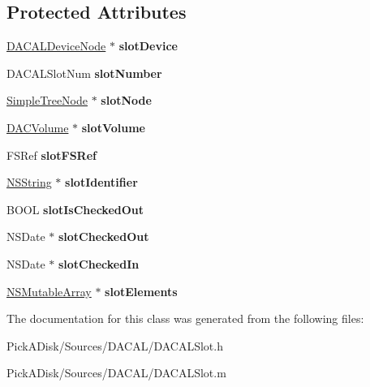 \subsection*{Protected Attributes}
\begin{DoxyCompactItemize}
\item 
\hypertarget{interface_d_a_c_a_l_slot_ad21e445e7323248f836d2ff47f73a28c}{
\hyperlink{interface_d_a_c_a_l_device_node}{DACALDeviceNode} $\ast$ {\bfseries slotDevice}}
\label{interface_d_a_c_a_l_slot_ad21e445e7323248f836d2ff47f73a28c}

\item 
\hypertarget{interface_d_a_c_a_l_slot_aff0ad5f88d1f523b314b6e92fcd860c1}{
DACALSlotNum {\bfseries slotNumber}}
\label{interface_d_a_c_a_l_slot_aff0ad5f88d1f523b314b6e92fcd860c1}

\item 
\hypertarget{interface_d_a_c_a_l_slot_a052b3c686f39a3388dc9edcfe0cfba78}{
\hyperlink{class_simple_tree_node}{SimpleTreeNode} $\ast$ {\bfseries slotNode}}
\label{interface_d_a_c_a_l_slot_a052b3c686f39a3388dc9edcfe0cfba78}

\item 
\hypertarget{interface_d_a_c_a_l_slot_a535f1c08be2deefca635b4c06ffb137b}{
\hyperlink{interface_d_a_c_volume}{DACVolume} $\ast$ {\bfseries slotVolume}}
\label{interface_d_a_c_a_l_slot_a535f1c08be2deefca635b4c06ffb137b}

\item 
\hypertarget{interface_d_a_c_a_l_slot_a2d73da79f5f2072a32d21da4948064c9}{
FSRef {\bfseries slotFSRef}}
\label{interface_d_a_c_a_l_slot_a2d73da79f5f2072a32d21da4948064c9}

\item 
\hypertarget{interface_d_a_c_a_l_slot_a5703a39fcff6111a695575a00f59aa2f}{
\hyperlink{class_n_s_string}{NSString} $\ast$ {\bfseries slotIdentifier}}
\label{interface_d_a_c_a_l_slot_a5703a39fcff6111a695575a00f59aa2f}

\item 
\hypertarget{interface_d_a_c_a_l_slot_aca46985adb53c9003831feba63357041}{
BOOL {\bfseries slotIsCheckedOut}}
\label{interface_d_a_c_a_l_slot_aca46985adb53c9003831feba63357041}

\item 
\hypertarget{interface_d_a_c_a_l_slot_ad9d71e96b861f811ad4f887d3ec28463}{
NSDate $\ast$ {\bfseries slotCheckedOut}}
\label{interface_d_a_c_a_l_slot_ad9d71e96b861f811ad4f887d3ec28463}

\item 
\hypertarget{interface_d_a_c_a_l_slot_a24ce8a659ae13009ab41e1b519285269}{
NSDate $\ast$ {\bfseries slotCheckedIn}}
\label{interface_d_a_c_a_l_slot_a24ce8a659ae13009ab41e1b519285269}

\item 
\hypertarget{interface_d_a_c_a_l_slot_a03eae9b0df596d2f5d68150f1f18ef06}{
\hyperlink{class_n_s_mutable_array}{NSMutableArray} $\ast$ {\bfseries slotElements}}
\label{interface_d_a_c_a_l_slot_a03eae9b0df596d2f5d68150f1f18ef06}

\end{DoxyCompactItemize}


The documentation for this class was generated from the following files:\begin{DoxyCompactItemize}
\item 
PickADisk/Sources/DACAL/DACALSlot.h\item 
PickADisk/Sources/DACAL/DACALSlot.m\end{DoxyCompactItemize}
